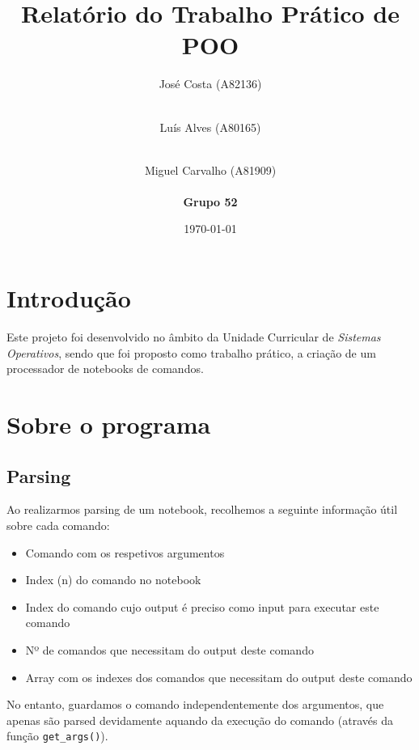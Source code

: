 \documentclass[a4paper]{article}
\begin{document}
\title{Relatório do Trabalho Prático de POO}
\author{
José Costa (A82136)\\\\
\and Luís Alves (A80165)\\\\
\and Miguel Carvalho (A81909)\\\\
\textbf{Grupo 52}
}
\date{\today}

\maketitle
\tableofcontents

\section{Introdução}

	\tab Este projeto foi desenvolvido no âmbito da Unidade Curricular de
	\textit{Sistemas Operativos}, sendo que foi proposto como trabalho
	prático, a criação de um processador de notebooks de comandos.

\section{Sobre o programa}

	\subsection{Parsing}
		\tab Ao realizarmos parsing de um notebook, recolhemos a seguinte informação
		útil sobre cada comando:
		\begin{itemize}
			\item Comando com os respetivos argumentos
			\item Index (n) do comando no notebook
			\item Index do comando cujo output é preciso como input para executar este comando
			\item Nº de comandos que necessitam do output deste comando
			\item Array com os indexes dos comandos que necessitam do output deste comando
		\end{itemize}
		\par No entanto, guardamos o comando independentemente dos argumentos, que apenas
		são parsed devidamente aquando da execução do comando (através da função \texttt{get\_args()}).
\end{document}
